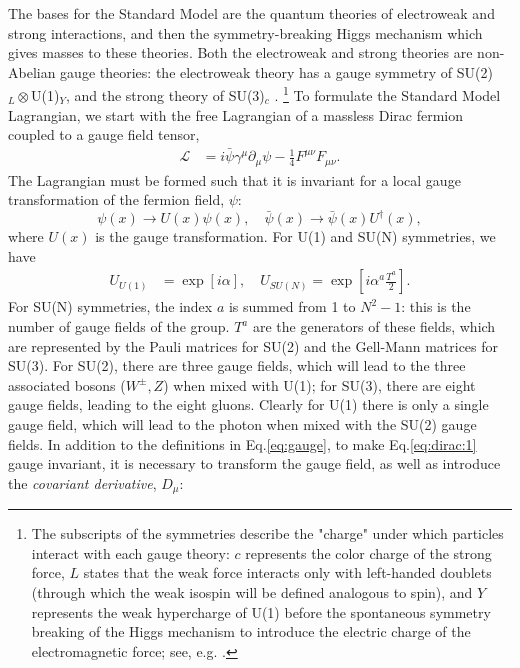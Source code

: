 \documentclass[a4paper,12pt]{article}
\begin{document}
The bases for the Standard Model are the quantum theories of electroweak and strong interactions, and then the symmetry-breaking Higgs mechanism which gives masses to these theories.
Both the electroweak and strong theories are non-Abelian gauge theories: the electroweak theory has a gauge symmetry of SU(2)$_{L}\otimes$U(1)$_Y$, and the strong theory of SU(3)$_{c}$ \cite{gsw,grosswilc}.
\hspace{-9pt}\footnote{The subscripts of the symmetries describe the "charge" under which particles interact with each gauge theory: $c$ represents the color charge of the strong force, $L$ states that the weak force interacts only with left-handed doublets (through which the weak isospin will be defined analogous to spin), and $Y$ represents the weak hypercharge of U(1) before the spontaneous symmetry breaking of the Higgs mechanism to introduce the electric charge of the electromagnetic force; see, e.g. \cite{schwartz}.}
\hspace{-5pt}To formulate the Standard Model Lagrangian, we start with the free Lagrangian of a massless Dirac fermion coupled to a gauge field tensor,
\begin{align}
    \label{eq:dirac:1}
    \mathcal{L} &= i\bar{\psi}\gamma^\mu\partial_\mu\psi - \frac14F^{\mu\nu}F_{\mu\nu}.
\end{align}
The Lagrangian must be formed such that it is invariant for a local gauge transformation of the fermion field, $\psi$:
\begin{equation}
    \label{eq:local}
    \psi(x)\to U(x)\psi(x),\quad \bar{\psi}(x)\to\bar{\psi}(x)U^\dagger(x),
\end{equation}
where $U(x)$ is the gauge transformation.
For U(1) and SU(N) symmetries, we have
\begin{align}
    \label{eq:gauge} 
    U_{U(1)} &= \exp\left[i\alpha\right],\quad U_{SU(N)} = \exp\left[i\alpha^a\frac{T^a}{2}\right].
\end{align}
For SU(N) symmetries, the index $a$ is summed from 1 to $N^2-1$: this is the number of gauge fields of the group.
$T^a$ are the generators of these fields, which are represented by the Pauli matrices for SU(2) and the Gell-Mann matrices for SU(3).
For SU(2), there are three gauge fields, which will lead to the three associated bosons ($W^{\pm},Z$) when mixed with U(1); for SU(3), there are eight gauge fields, leading to the eight gluons.
Clearly for U(1) there is only a single gauge field, which will lead to the photon when mixed with the SU(2) gauge fields.
In addition to the definitions in Eq.\eqref{eq:gauge}, to make Eq.\eqref{eq:dirac:1} gauge invariant, it is necessary to transform the gauge field, as well as introduce the \textit{covariant derivative}, $D_\mu$:
\end{document}
